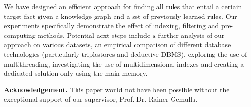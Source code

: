 \documentclass[english]{lni}
\begin{document}
%
%

We have designed an efficient approach for finding all rules that entail a certain target fact given a knowledge graph and a set of previously learned rules. Our experiments specifically demonstrate the effect of indexing, filtering and pre-computing methods. Potential next steps include a further analysis of our approach on various datasets, an empirical comparison of different database technologies (particularly triplestores and deductive DBMS), exploring the use of multithreading, investigating the use of multidimensional indexes and creating a dedicated solution only using the main memory.

\textbf{Acknowledgement.} This paper would not have been possible without the exceptional support of our supervisor, Prof. Dr. Rainer Gemulla.

\end{document}
